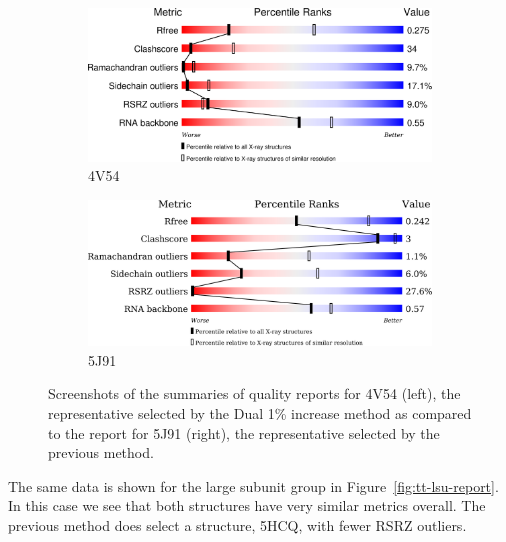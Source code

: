 \begin{figure}
  \begin{subfigure}[b]{0.5\textwidth}
    \includegraphics[width=\linewidth]{chapter-4/figs/quality-reports/4V54}
    \caption{4V54}
    \label{fig:4V54-quality}
  \end{subfigure}
  \begin{subfigure}[b]{0.5\textwidth}
    \includegraphics[width=\linewidth]{chapter-4/figs/quality-reports/5J91}
    \caption{5J91}
    \label{fig:5J91-quality}
  \end{subfigure}
  \caption{Screenshots of the summaries of quality reports for 4V54 (left), the
    representative selected by the Dual 1\% increase method as compared to the
    report for 5J91 (right), the representative selected by the previous
  method.}
  \label{fig:ec-lsu-report}
\end{figure}

The same data is shown for the \TT{} large subunit group in
Figure~\ref{fig:tt-lsu-report}. In this case we see that both structures have
very similar metrics overall. The previous method does select a structure, 5HCQ,
with fewer RSRZ outliers.


